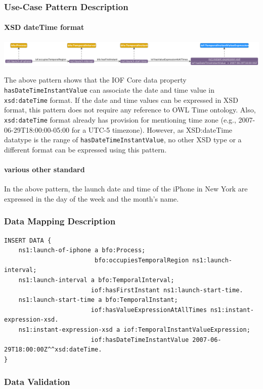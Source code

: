 \subsubsection*{Use-Case Pattern Description}

\paragraph{XSD dateTime format \\}

\includegraphics[scale=0.29]{scenarios/clock-time-calendar-date/images/uc1-xsd.png}

The above pattern shows that the IOF Core data property \texttt{hasDateTimeInstantValue} can associate the date and time value in \texttt{xsd:dateTime} format. If the date and time values can be expressed in XSD format, this pattern does not require any reference to OWL Time ontology. Also, \texttt{xsd:dateTime} format already has provision for mentioning time zone (e.g., 2007-06-29T18:00:00-05:00 for a UTC-5 timezone). However, as XSD:dateTime datatype is the range of \texttt{hasDateTimeInstantValue}, no other XSD type or a different format can be expressed using this pattern. 

\paragraph{various other standard \\}

In the above pattern, the launch date and time of the iPhone in New York are expressed in the day of the week and the month's name.     



\subsubsection*{Data Mapping Description}

\begin{verbatim}
INSERT DATA {
    ns1:launch-of-iphone a bfo:Process;
                         bfo:occupiesTemporalRegion ns1:launch-interval;
    ns1:launch-interval a bfo:TemporalInterval;
                        iof:hasFirstInstant ns1:launch-start-time.
    ns1:launch-start-time a bfo:TemporalInstant;
                        iof:hasValueExpressionAtAllTimes ns1:instant-expression-xsd.
    ns1:instant-expression-xsd a iof:TemporalInstantValueExpression; 
                        iof:hasDateTimeInstantValue 2007-06-29T18:00:00Z^^xsd:dateTime.
}
\end{verbatim}


\subsubsection*{Data Validation}

